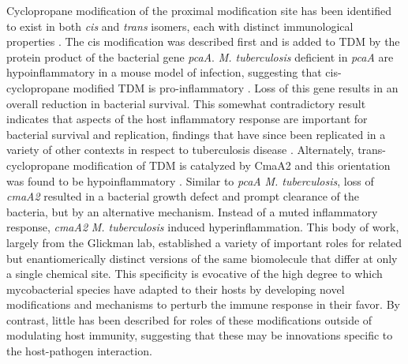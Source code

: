 Cyclopropane modification of the proximal modification site has been identified to exist in both \textit{cis} and \textit{trans} isomers, each with distinct immunological properties \citep{Glickman2000, Glickman2001, Rao2005, Rao2006}. The cis modification was described first and is added to TDM by the protein product of the bacterial gene \textit{pcaA}. \textit{M. tuberculosis} deficient in \textit{pcaA} are hypoinflammatory in a mouse model of infection, suggesting that cis-cyclopropane modified TDM is pro-inflammatory \citep{Rao2005}. Loss of this gene results in an overall reduction in bacterial survival. This somewhat contradictory result indicates that aspects of the host inflammatory response are important for bacterial survival and replication, findings that have since been replicated in a variety of other contexts in respect to tuberculosis disease \citep{Huynh2011, Sasindran2011, Tobin2012, Koul2004, Flynn2005}. Alternately, trans-cyclopropane modification of TDM is catalyzed by CmaA2 and this orientation was found to be hypoinflammatory \citep{Rao2006}. Similar to \textDelta \textit{pcaA} \textit{M. tuberculosis}, loss of \textit{cmaA2} resulted in a bacterial growth defect and prompt clearance of the bacteria, but by an alternative mechanism. Instead of a muted inflammatory response, \textDelta \textit{cmaA2} \textit{M. tuberculosis} induced hyperinflammation. This body of work, largely from the Glickman lab, established a variety of important roles for related but enantiomerically distinct versions of the same biomolecule that differ at only a single chemical site. This specificity is evocative of the high degree to which mycobacterial species have adapted to their hosts by developing novel modifications and mechanisms to perturb the immune response in their favor. By contrast, little has been described for roles of these modifications outside of modulating host immunity, suggesting that these may be innovations specific to the host-pathogen interaction.

